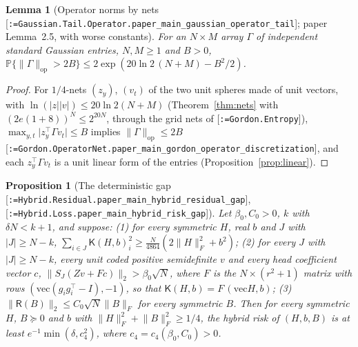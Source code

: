 \documentclass[11pt]{article}
\makeatletter
\newcommand{\formal@break}[1]{\@tfor\formal@tok:=#1\do{%
  \formal@tok
  \expandafter\ifx\formal@tok.\allowbreak\else
  \expandafter\ifx\formal@tok\_\allowbreak\fi\fi}}
\DeclareRobustCommand{\formal}[1]{\textnormal{[\texttt{\small\formal@break{#1}}]}}
\newcommand{\Prob}{\mathbb{P}}
\newcommand{\norm}[1]{\lVert #1\rVert}
\newcommand{\abs}[1]{\lvert #1\rvert}
\newcommand{\op}{\mathrm{op}}
\newcommand{\Fro}{F}
\newcommand{\Id}{I}
\theoremstyle{plain}
\newtheorem{proposition}[theorem]{Proposition}
\newtheorem{lemma}[theorem]{Lemma}
\theoremstyle{definition}
\makeatother
\begin{document}
\begin{lemma}[Operator norms by nets \formal{Gaussian.Tail.Operator.paper\_main\_gaussian\_operator\_tail}; paper Lemma~2.5, with worse constants]\label{lem:opnet}
For an $N\times M$ array $\Gamma$ of independent standard Gaussian entries,
$N, M \ge 1$ and $B > 0$, $\Prob\{\norm{\Gamma}_\op > 2B\} \le 2\exp(20\ln2\,(N + M) - B^2/2)$.
\end{lemma}

\begin{proof}
For $1/4$-nets $(z_y)$, $(v_t)$ of the two unit spheres made of unit vectors,
with $\ln(\abs{z}\abs{v}) \le 20\ln2(N+M)$ (Theorem~\ref{thm:nets} with
$(2e(1 + 8))^N \le 2^{20N}$, through the grid nets of \formal{Gordon.Entropy}),
$\max_{y,t}\abs{z_y^{\top}\Gamma v_t} \le B$ implies $\norm{\Gamma}_\op \le 2B$
\formal{Gordon.OperatorNet.paper\_main\_gordon\_operator\_discretization},
and each $z_y^{\top}\Gamma v_t$ is a unit linear form of the entries
(Proposition~\ref{prop:linear}).
\end{proof}

\begin{proposition}[The deterministic gap \formal{Hybrid.Residual.paper\_main\_hybrid\_residual\_gap}, \formal{Hybrid.Loss.paper\_main\_hybrid\_risk\_gap}]\label{prop:detgap}
Let $\beta_0, C_0 > 0$, $k$ with $\delta N < k + 1$, and suppose:
(1) for every symmetric $H$, real $b$ and $J$ with $\abs{J} \ge N - k$,
$\sum_{i\in J}\mathsf{K}(H,b)_i^2 \ge \frac N{4864}(2\norm{H}_\Fro^2 + b^2)$;
(2) for every $J$ with $\abs{J} \ge N - k$, every unit coded positive
semidefinite $v$ and every head coefficient vector $c$,
$\norm{S_J(Zv + Fc)}_2 > \beta_0\sqrt N$, where $F$ is the $N\times(r^2+1)$
matrix with rows $(\mathrm{vec}(g_ig_i^{\top} - \Id), -1)$, so that
$\mathsf{K}(H,b) = F\,(\mathrm{vec}H, b)$;
(3) $\norm{\mathsf{R}(B)}_2 \le C_0\sqrt N\norm{B}_\Fro$ for every symmetric $B$.
Then for every symmetric $H$, $B \succeq 0$ and $b$ with
$\norm{H}_\Fro^2 + \norm{B}_\Fro^2 \ge 1/4$, the hybrid risk of $(H, b, B)$ is at
least $e^{-1}\min(\delta, c_4^2)$, where $c_4 = c_4(\beta_0, C_0) > 0$.
\end{proposition}
\end{document}

